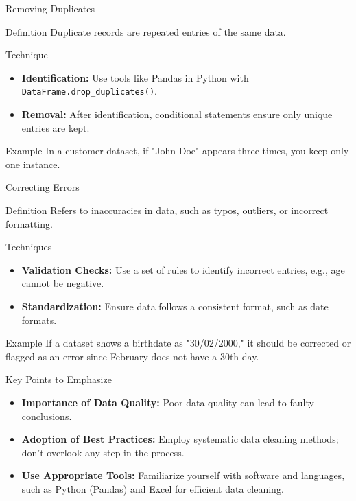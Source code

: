 \documentclass[aspectratio=169]{beamer}
\begin{document}
\begin{frame}[fragile]{Removing Duplicates}
    \begin{block}{Definition}
        Duplicate records are repeated entries of the same data.
    \end{block}
    
    \begin{block}{Technique}
        \begin{itemize}
            \item \textbf{Identification:} Use tools like Pandas in Python with \texttt{DataFrame.drop\_duplicates()}.
            \item \textbf{Removal:} After identification, conditional statements ensure only unique entries are kept.
        \end{itemize}
    \end{block}

    \begin{block}{Example}
        In a customer dataset, if "John Doe" appears three times, you keep only one instance.
    \end{block}
\end{frame}

\begin{frame}[fragile]{Correcting Errors}
    \begin{block}{Definition}
        Refers to inaccuracies in data, such as typos, outliers, or incorrect formatting.
    \end{block}
    
    \begin{block}{Techniques}
        \begin{itemize}
            \item \textbf{Validation Checks:} Use a set of rules to identify incorrect entries, e.g., age cannot be negative.
            \item \textbf{Standardization:} Ensure data follows a consistent format, such as date formats.
        \end{itemize}
    \end{block}

    \begin{block}{Example}
        If a dataset shows a birthdate as "30/02/2000," it should be corrected or flagged as an error since February does not have a 30th day.
    \end{block}
\end{frame}

\begin{frame}[fragile]{Key Points to Emphasize}
    \begin{itemize}
        \item \textbf{Importance of Data Quality:} Poor data quality can lead to faulty conclusions.
        \item \textbf{Adoption of Best Practices:} Employ systematic data cleaning methods; don’t overlook any step in the process.
        \item \textbf{Use Appropriate Tools:} Familiarize yourself with software and languages, such as Python (Pandas) and Excel for efficient data cleaning.
    \end{itemize}
\end{frame}
\end{document}
